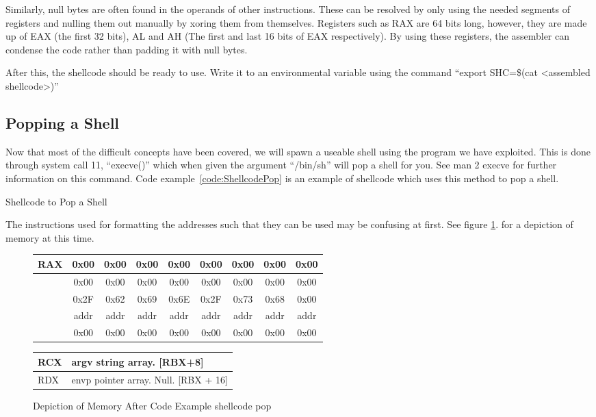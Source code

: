 			Similarly, null bytes are often found in the operands of other instructions.
			These can be resolved by only using the needed segments of registers and nulling them out manually by xoring them from themselves.
			Registers such as RAX are 64 bits long, however, they are made up of EAX (the first 32 bits), AL and AH (The first and last 16 bits of EAX respectively).
			By using these registers, the assembler can condense the code rather than padding it with null bytes.

			After this, the shellcode should be ready to use.
			Write it to an environmental variable using the command ``export SHC=\$(cat <assembled shellcode>)''
		\subsection{Popping a Shell}
			Now that most of the difficult concepts have been covered, we will spawn a useable shell using the program we have exploited.
			This is done through system call 11, ``execve()'' which when given the argument ``/bin/sh'' will pop a shell for you.
			See man 2 execve for further information on this command.
			Code example~\ref{code:ShellcodePop} is an example of shellcode which uses this method to pop a shell.
			\begin{code}
				\caption{Shellcode to Pop a Shell}\label{code:ShellcodePop}
			\end{code}
			The instructions used for formatting the addresses such that they can be used may be confusing at first.
			See figure \ref{fg:ShellPopMemory}.
			for a depiction of memory at this time.
			\begin{figure}[htb]
				\centering
				\begin{tabular}{| l | c | c | c | c | c | c | c | c |}
					\hline
					RAX	& 0x00 	& 0x00	& 0x00	& 0x00	& 0x00	& 0x00	& 0x00	& 0x00 \\ \hline
						& 0x00	& 0x00	& 0x00	& 0x00	& 0x00	& 0x00	& 0x00	& 0x00 \\
					\hline
					\hline
					[RBX] 	& 0x2F & 0x62 & 0x69 & 0x6E & 0x2F & 0x73 & 0x68 & 0x00 \\ \hline
						  & addr & addr & addr & addr & addr & addr & addr & addr \\ \hline
						  & 0x00 & 0x00	& 0x00	& 0x00	& 0x00	& 0x00	& 0x00	& 0x00 \\
					\hline
				\end{tabular}
				\begin{tabular}{| l @{ -> } l |}
					\hline
					RCX & argv string array. [RBX+8] \\ \hline
					RDX & envp pointer array. Null. [RBX + 16] \\
					\hline
				\end{tabular}
				\caption[Depiction of memory after shellcode]{Depiction of Memory After Code Example shellcode pop} %
				\label{fg:ShellPopMemory}
			\end{figure}

